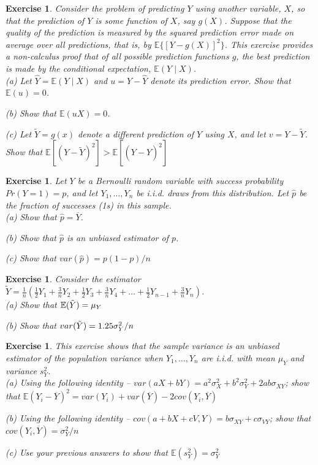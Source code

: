 \documentclass{article}
\newtheorem{exercise}[theorem]{Exercise}
\begin{document}
\begin{exercise} %
Consider the problem of predicting $Y$ using another variable, $X$, so that the prediction of $Y$ is some function of $X$, say $g(X)$. Suppose that the quality of the prediction is measured by the squared prediction error made on average over all predictions, that is, by $\mathbb{E}\{[Y-g(X)]^2\}$. This exercise provides a non-calculus proof that of all possible prediction functions $g$, the best prediction is made by the conditional expectation, $\mathbb{E}(Y \mid X)$.\\

(a) Let $\hat{Y}=\mathbb{E}(Y \mid X)$ and $u=Y-\hat{Y}$ denote its prediction error. Show
that $\mathbb{E}(u)=0$.

(b) Show that $\mathbb{E}(uX)=0$.

(c) Let $\tilde{Y}=g(x)$ denote a different prediction of $Y$ using $X$, and let $v=Y-\tilde{Y}$. Show that $\mathbb{E}[(Y-\tilde{Y})^2]>\mathbb{E}[(Y-\hat{Y})^2]$
\end{exercise}


\begin{exercise} %
Let $Y$ be a Bernoulli random variable with success probability $Pr(Y = 1) = p$,
and let $Y_1, \dots, Y_n$ be i.i.d. draws from this distribution. Let $\hat{p}$ be the fraction of successes (1s) in this sample.\\

(a) Show that $\hat{p}=\overline{Y}$.

(b) Show that $\hat{p}$ is an unbiased estimator of $p$.

(c) Show that $var(\hat{p}) = p(1-p)/n$

\end{exercise}


\begin{exercise}%
Consider the estimator $\tilde{Y} = \frac{1}{n}(\frac{1}{2}Y_1+\frac{3}{n}Y_2+\frac{1}{2}Y_3+\frac{3}{n}Y_4+\dots+\frac{1}{2}Y_{n-1}+\frac{3}{n}Y_n)$.\\

(a) Show that $\mathbb{E}(\Tilde{Y})=\mu_Y$

(b) Show that $var(\Tilde{Y})=1.25\sigma^2_Y/n$
\end{exercise}


\begin{exercise}%
This exercise shows that the sample variance is an unbiased estimator of the population variance when $Y_1, \dots, Y_n$ are i.i.d. with mean $\mu_Y$ and variance $s_Y^2$.\\

(a) Using the following identity -- $var(aX+bY)=a^2\sigma_X^2 +b^2\sigma_Y^2 + 2ab\sigma_{XY}$; show that $\mathbb{E}(Y_i-\overline{Y})^2 = var(Y_i) + var(\overline{Y}) - 2cov(Y_i, \overline{Y}) $

(b) Using the following identity -- $cov(a+bX+cV, Y)=b\sigma_{XY} + c\sigma_{VY}$; show that $cov(Y_i, \overline{Y}) = \sigma^2_Y/n $

(c) Use your previous answers to show that $\mathbb{E}(s^2_Y)=\sigma^2_Y$

\end{exercise}
\end{document}
